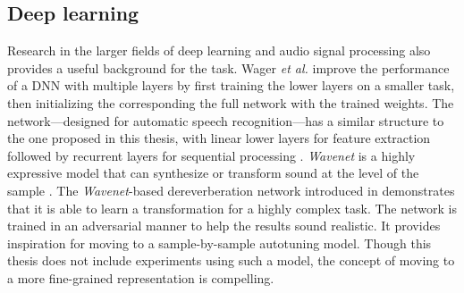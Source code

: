\subsection{Deep learning}
Research in the larger fields of deep learning and audio signal processing also provides a useful background for the task. Wager \textit{et al.} improve the performance of a DNN with multiple layers by first training the lower layers on a smaller task, then initializing the corresponding the full network with the trained weights. The network---designed for automatic speech recognition---has a similar structure to the one proposed in this thesis, with linear lower layers for feature extraction followed by recurrent layers for sequential processing \cite{wager2020fully}.
\textit{Wavenet} is a highly expressive model that can synthesize or transform sound at the level of the sample \cite{oord2016wavenet}. The \textit{Wavenet}-based dereverberation network introduced in \cite{su2020hifi} demonstrates that it is able to learn a transformation for a highly complex task. The network is trained in an adversarial manner \cite{goodfellow2014generative} to help the results sound realistic. It provides inspiration for moving to a sample-by-sample autotuning model. Though this thesis does not include experiments using such a model, the concept of moving to a more fine-grained representation is compelling.

